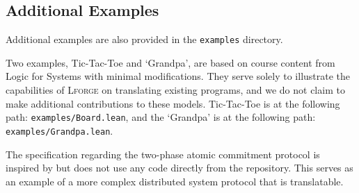 \subsection[]{Additional Examples}\label{appendix:additional-examples}
Additional examples are also provided in the \texttt{examples} directory. 

Two examples, Tic-Tac-Toe and `Grandpa', are based on course content from Logic for Systems \cite{l4s} with minimal modifications. They serve solely to illustrate the capabilities of \textsc{Lforge} on translating existing programs, and we do not claim to make additional contributions to these models. Tic-Tac-Toe is at the following path: \texttt{examples/Board.lean}, and the `Grandpa' is at the following path: \texttt{examples/Grandpa.lean}. 

The specification regarding the two-phase atomic commitment protocol is inspired by \cite{distributedforge} but does not use any code directly from the repository. This serves as an example of a more complex distributed system protocol that is translatable. 